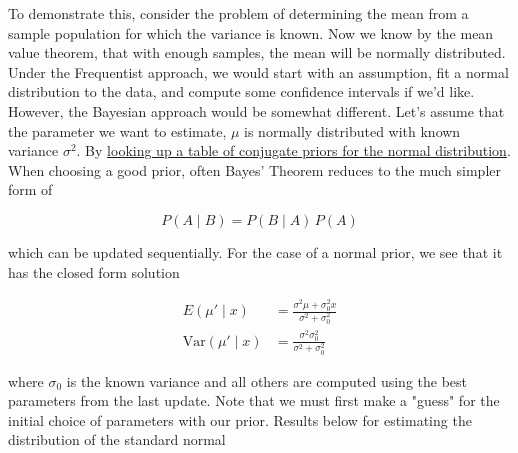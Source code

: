 \documentclass[11pt]{article}
\begin{document}
To demonstrate this, consider the problem of determining the mean from a
sample population for which the variance is known. Now we know by the
mean value theorem, that with enough samples, the mean will be normally
distributed. Under the Frequentist approach, we would start with an
assumption, fit a normal distribution to the data, and compute some
confidence intervals if we'd like. However, the Bayesian approach would
be somewhat different. Let's assume that the parameter we want to
estimate, \(\mu\) is normally distributed with known variance
\(\sigma^2\). By
\href{https://en.wikipedia.org/wiki/Conjugate_prior}{looking up a table
of conjugate priors for the normal distribution}. When choosing a good
prior, often Bayes' Theorem reduces to the much simpler form of

\[P(A\mid B) = P(B \mid A) \, P(A)\]

which can be updated sequentially. For the case of a normal prior, we
see that it has the closed form solution

\[\begin{align}
E(\mu' \mid x) &= \frac{\sigma^2\mu + \sigma^2_0 x}{\sigma^2 + \sigma^2_0} \\[7pt]
\mathrm{Var}(\mu' \mid x) &= \frac{\sigma^2 \sigma^2_0}{\sigma^2 + \sigma^2_0}
\end{align}\]

where \(\sigma_0\) is the known variance and all others are computed
using the best parameters from the last update. Note that we must first
make a "guess" for the initial choice of parameters with our prior.
Results below for estimating the distribution of the standard normal
\end{document}
